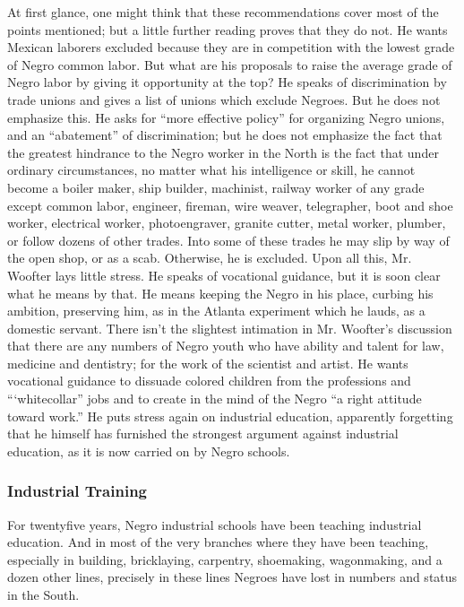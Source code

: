 \documentclass[letterpaper,10pt,english]{jupyterBook}
\begin{document}
\sphinxAtStartPar
At first glance, one might think that these recommendations cover most of the points mentioned; but a little further reading proves that they do not. He wants Mexican laborers excluded because they are in competition with the lowest grade of Negro common labor. But what are his proposals to raise the average grade of Negro labor by giving it opportunity at the top? He speaks of discrimination by trade unions and gives a list of unions which exclude Negroes. But he does not emphasize this. He asks for “more effective policy” for organizing Negro unions, and an “abatement” of discrimination; but he does not emphasize the fact that the greatest hindrance to the Negro worker in the North is the fact that under ordinary circumstances, no matter what his intelligence or skill, he cannot become a boiler maker, ship builder, machinist, railway worker of any grade except common labor, engineer, fireman, wire weaver, telegrapher, boot and shoe worker, electrical worker, photo\sphinxhyphen{}engraver, granite cutter, metal worker, plumber, or follow dozens of other trades. Into some of these trades he may slip by way of the open shop, or as a scab. Otherwise, he is excluded. Upon all this, Mr. Woofter lays little stress. He speaks of vocational guidance, but it is soon clear what he means by that. He means keeping the Negro in his place, curbing his ambition, preserving him, as in the Atlanta experiment which he lauds, as a domestic servant. There isn’t the slightest intimation in Mr. Woofter’s discussion that there are any numbers of Negro youth who have ability and talent for law, medicine and dentistry; for the work of the scientist and artist. He wants vocational guidance to dissuade colored children from the professions and “‘white\sphinxhyphen{}collar” jobs and to create in the mind of the Negro “a right attitude toward work.” He puts stress again on industrial education, apparently forgetting that he himself has furnished the strongest argument against industrial education, as it is now carried on by Negro schools.


\subsubsection{Industrial Training}
\label{\detokenize{Volumes/38/03/woofterism:industrial-training}}
\sphinxAtStartPar
For twenty\sphinxhyphen{}five years, Negro industrial schools have been teaching industrial education. And in most of the very branches where they have been teaching, especially in building, bricklaying, carpentry, shoe\sphinxhyphen{}making, wagonmaking, and a dozen other lines, precisely in these lines Negroes have lost in numbers and status in the South.
\end{document}
